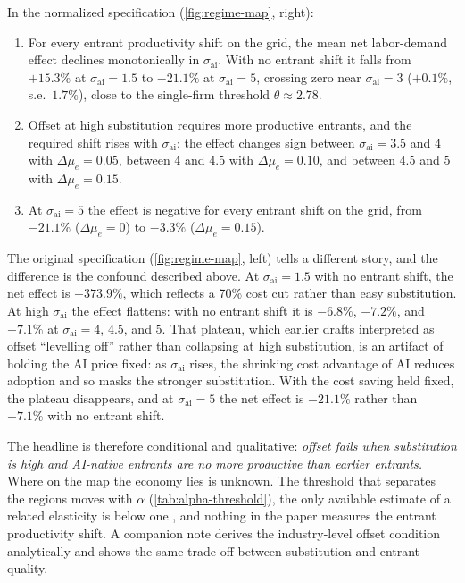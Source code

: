 \begin{result}\label{res:offset}
In the normalized specification (\cref{fig:regime-map}, right):
\begin{enumerate}
  \item[(i)] For every entrant productivity shift on the grid, the mean net labor-demand effect declines monotonically in $\sigma_{\text{ai}}$. With no entrant shift it falls from $+15.3\%$ at $\sigma_{\text{ai}} = 1.5$ to $-21.1\%$ at $\sigma_{\text{ai}} = 5$, crossing zero near $\sigma_{\text{ai}} = 3$ ($+0.1\%$, s.e.\ $1.7\%$), close to the single-firm threshold $\theta \approx 2.78$.
  \item[(ii)] Offset at high substitution requires more productive entrants, and the required shift rises with $\sigma_{\text{ai}}$: the effect changes sign between $\sigma_{\text{ai}} = 3.5$ and $4$ with $\Delta\mu_e = 0.05$, between $4$ and $4.5$ with $\Delta\mu_e = 0.10$, and between $4.5$ and $5$ with $\Delta\mu_e = 0.15$.
  \item[(iii)] At $\sigma_{\text{ai}} = 5$ the effect is negative for every entrant shift on the grid, from $-21.1\%$ ($\Delta\mu_e = 0$) to $-3.3\%$ ($\Delta\mu_e = 0.15$).
\end{enumerate}
\end{result}

\noindent
The original specification (\cref{fig:regime-map}, left) tells a different story, and the difference is the confound described above.
At $\sigma_{\text{ai}} = 1.5$ with no entrant shift, the net effect is $+373.9\%$, which reflects a 70\% cost cut rather than easy substitution.
At high $\sigma_{\text{ai}}$ the effect flattens: with no entrant shift it is $-6.8\%$, $-7.2\%$, and $-7.1\%$ at $\sigma_{\text{ai}} = 4$, $4.5$, and $5$.
That plateau, which earlier drafts interpreted as offset ``levelling off'' rather than collapsing at high substitution, is an artifact of holding the AI price fixed: as $\sigma_{\text{ai}}$ rises, the shrinking cost advantage of AI reduces adoption and so masks the stronger substitution.
With the cost saving held fixed, the plateau disappears, and at $\sigma_{\text{ai}} = 5$ the net effect is $-21.1\%$ rather than $-7.1\%$ with no entrant shift.

The headline is therefore conditional and qualitative: \emph{offset fails when substitution is high and AI-native entrants are no more productive than earlier entrants.}
Where on the map the economy lies is unknown.
The threshold that separates the regions moves with $\alpha$ (\cref{tab:alpha-threshold}), the only available estimate of a related elasticity is below one \citep{luduvice2026ai}, and nothing in the paper measures the entrant productivity shift.
A companion note derives the industry-level offset condition analytically and shows the same trade-off between substitution and entrant quality.

